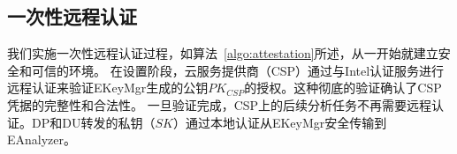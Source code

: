 \subsection{一次性远程认证}
我们实施一次性远程认证过程，如算法~\ref{algo:attestation}所述，从一开始就建立安全和可信的环境。 
在设置阶段，云服务提供商（CSP）通过与Intel认证服务进行远程认证来验证EKeyMgr生成的公钥$PK_{CSP}$的授权。这种彻底的验证确认了CSP凭据的完整性和合法性。
一旦验证完成，CSP上的后续分析任务不再需要远程认证。DP和DU转发的私钥（$SK$）通过本地认证从EKeyMgr安全传输到EAnalyzer。
